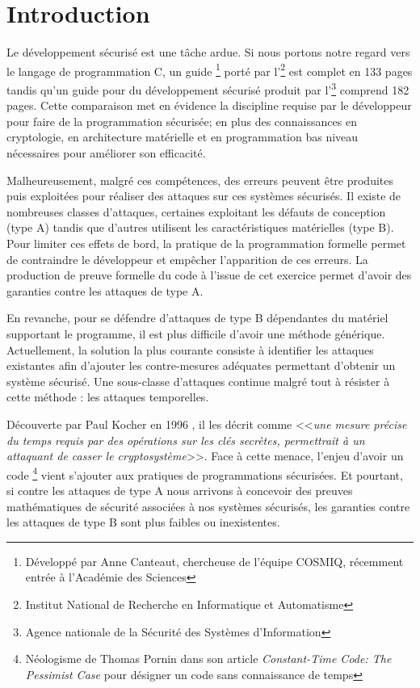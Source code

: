 \chapter*{Introduction}

Le développement sécurisé est une tâche ardue. Si nous portons notre regard vers le langage de programmation C, un guide \cite{progC_guide}\footnote{Développé par Anne Canteaut, chercheuse de l'équipe COSMIQ, récemment entrée à l'Académie des Sciences} porté par l'\footnote{Institut National de Recherche en Informatique et Automatisme} est complet en 133 pages tandis qu'un guide pour du développement sécurisé\cite{anssi_guideForSecureprogramming} produit par l'\footnote{Agence nationale de la Sécurité des Systèmes d'Information} comprend 182 pages. Cette comparaison met en évidence la discipline requise par le développeur pour faire de la programmation sécurisée; en plus des connaissances en cryptologie, en architecture matérielle et en programmation bas niveau nécessaires pour améliorer son efficacité. \medbreak

Malheureusement, malgré ces compétences, des erreurs peuvent être produites puis exploitées pour réaliser des attaques sur ces systèmes sécurisés. Il existe de nombreuses classes d'attaques, certaines exploitant les défauts de conception (type A) tandis que d'autres utilisent les caractéristiques matérielles (type B). Pour limiter ces effets de bord, la pratique de la programmation formelle permet de contraindre le développeur et empêcher l'apparition de ces erreurs. La production de preuve formelle du code à l'issue de cet exercice permet d'avoir des garanties contre les attaques de type A.

En revanche, pour se défendre d'attaques de type B dépendantes du matériel supportant le programme, il est plus difficile d'avoir une méthode générique. Actuellement, la solution la plus courante consiste à identifier les attaques existantes afin d'ajouter les contre-mesures adéquates permettant d'obtenir un système sécurisé. Une sous-classe d'attaques continue malgré tout à résister à cette méthode : les attaques temporelles.\medbreak

Découverte par Paul Kocher en 1996 \cite{crypto-1996-1469}, il les décrit comme <<\textit{une mesure précise du temps requis par des opérations sur les clés secrètes, permettrait à un attaquant de casser le cryptosystème}>>. Face à cette menace, l'enjeu d'avoir un code \textit{}\footnote{Néologisme de Thomas Pornin dans son article \textit{Constant-Time Code: The Pessimist Case} \cite{constantTimePornin} pour désigner un code sans connaissance de temps} vient s'ajouter aux pratiques de programmations sécurisées. Et pourtant, si contre les attaques de type A nous arrivons à concevoir des preuves mathématiques de sécurité associées à nos systèmes sécurisés, les garanties contre les attaques de type B sont plus faibles ou inexistentes.\medbreak

